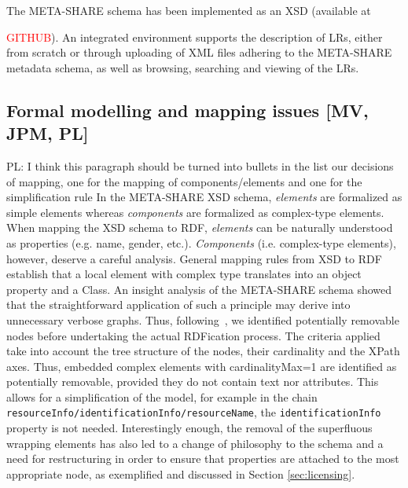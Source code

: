 \documentclass{llncs}
\begin{document}
The META-SHARE schema has been implemented as an XSD (available at {\textcolor{red}{GITHUB}). An integrated environment supports the description of LRs, either from scratch or through uploading of XML files adhering to the META-SHARE metadata schema, as well as browsing, searching and viewing of the LRs.
\subsection{Formal modelling and mapping issues [MV, JPM, PL]}
\label{sec:mapping}
{PL: I think this paragraph should be turned into bullets in the list our decisions of mapping, one for the mapping of components/elements and one for the simplification rule}
In the META-SHARE XSD schema, \emph{elements} are formalized as simple elements whereas \emph{components} are formalized as complex-type elements. When mapping the XSD schema to RDF, \emph{elements} can be naturally understood as properties (e.g. name, gender, etc.). \emph{Components} (i.e. complex-type elements), however, deserve a careful analysis. General mapping rules from XSD to RDF establish that a local element with complex type translates into an object property and a Class. An insight analysis of the META-SHARE schema showed that the straightforward application of such a principle may derive into unnecessary verbose graphs. Thus, following~\cite{Villegas2014}, we identified potentially removable nodes before undertaking the actual RDFication process. The criteria applied take into account the tree structure of the nodes, their cardinality and the XPath axes. Thus, embedded complex elements with cardinalityMax=1 are identified as potentially removable, provided they do not contain text nor attributes. This allows for a simplification of the model, for example in the chain {\tt resourceInfo/identificationInfo/resourceName}, the {\tt identificationInfo} property is not needed. Interestingly enough, the removal of the superfluous wrapping elements has also led to a change of philosophy to the schema and a need for restructuring in order to ensure that properties are attached to the most appropriate node, as exemplified and discussed in Section \ref{sec:licensing}.
}
\end{document}
